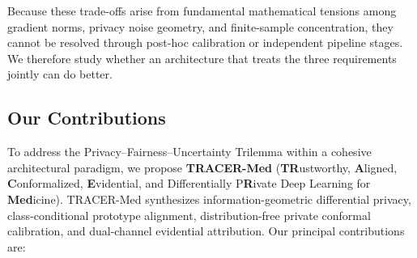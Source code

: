 \documentclass[pdflatex,sn-vancouver-num,referee,lineno]{sn-jnl}
\theoremstyle{thmstyleone}
\theoremstyle{thmstylethree}
\begin{document}
Because these trade-offs arise from fundamental mathematical tensions among gradient norms, privacy noise geometry, and finite-sample concentration, they cannot be resolved through post-hoc calibration or independent pipeline stages. We therefore study whether an architecture that treats the three requirements jointly can do better.

\subsection{Our Contributions}
To address the Privacy--Fairness--Uncertainty Trilemma within a cohesive architectural paradigm, we propose \textbf{TRACER-Med} (\textbf{TR}ustworthy, \textbf{A}ligned, \textbf{C}onformalized, \textbf{E}vidential, and Differentially P\textbf{R}ivate Deep Learning for \textbf{Med}icine). TRACER-Med synthesizes information-geometric differential privacy, class-conditional prototype alignment, distribution-free private conformal calibration, and dual-channel evidential attribution. Our principal contributions are:
\end{document}

